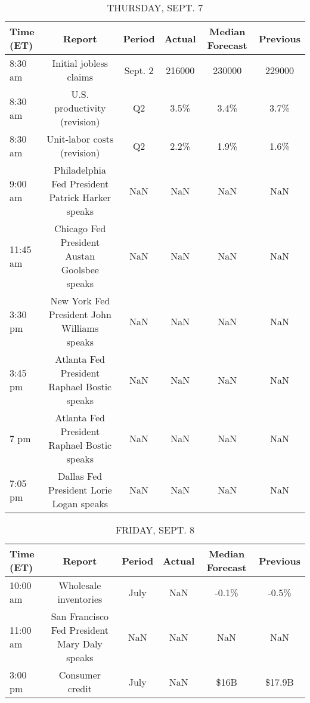 \documentclass{article}%
\begin{document}
%


\begin{table}[htbp]%
\caption{THURSDAY, SEPT. 7}%
\centering%
\begin{adjustbox}{width=1\textwidth}%
\begin{tabular}{lccccc}
\toprule
Time (ET) &                                           Report &  Period & Actual & Median Forecast & Previous \\
\midrule
  8:30 am &                           Initial jobless claims & Sept. 2 & 216000 &          230000 &   229000 \\
  8:30 am &                     U.S. productivity (revision) &      Q2 &   3.5\% &            3.4\% &     3.7\% \\
  8:30 am &                      Unit-labor costs (revision) &      Q2 &   2.2\% &            1.9\% &     1.6\% \\
  9:00 am & Philadelphia Fed President Patrick Harker speaks &     NaN &    NaN &             NaN &      NaN \\
 11:45 am &     Chicago Fed President Austan Goolsbee speaks &     NaN &    NaN &             NaN &      NaN \\
  3:30 pm &      New York Fed President John Williams speaks &     NaN &    NaN &             NaN &      NaN \\
  3:45 pm &      Atlanta Fed President Raphael Bostic speaks &     NaN &    NaN &             NaN &      NaN \\
     7 pm &      Atlanta Fed President Raphael Bostic speaks &     NaN &    NaN &             NaN &      NaN \\
  7:05 pm &          Dallas Fed President Lorie Logan speaks &     NaN &    NaN &             NaN &      NaN \\
\bottomrule
\end{tabular}
%
\end{adjustbox}%
\end{table}

%


\begin{table}[htbp]%
\caption{FRIDAY, SEPT. 8}%
\centering%
\begin{adjustbox}{width=1\textwidth}%
\begin{tabular}{lccccc}
\toprule
Time (ET) &                                       Report & Period & Actual & Median Forecast & Previous \\
\midrule
 10:00 am &                        Wholesale inventories &   July &    NaN &           -0.1\% &    -0.5\% \\
 11:00 am & San Francisco Fed President Mary Daly speaks &    NaN &    NaN &             NaN &      NaN \\
  3:00 pm &                              Consumer credit &   July &    NaN &            \$16B &   \$17.9B \\
\bottomrule
\end{tabular}
%
\end{adjustbox}%
\end{table}
\end{document}
